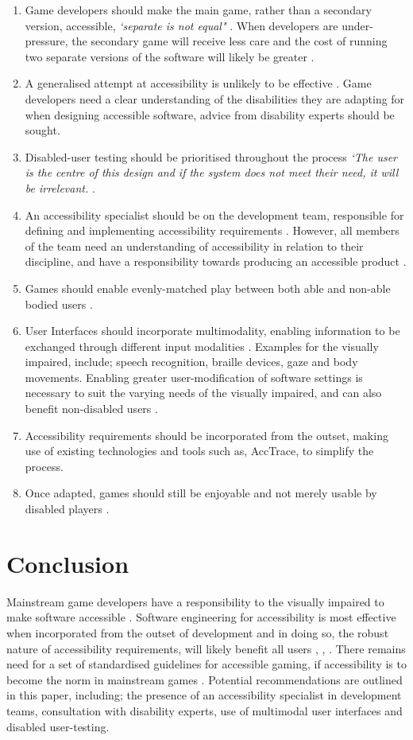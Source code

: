 \documentclass{scrartcl}
\begin{document}
\begin{enumerate}
\item Game developers should make the main game, rather than a secondary version, accessible, \textit{`separate is not equal"} \cite{17}. When developers are under-pressure, the secondary game will receive less care and the cost of running two separate versions of the software will likely be greater \cite{17}.
\item A generalised attempt at accessibility is unlikely to be effective \cite{17}. Game developers need a clear understanding of the disabilities they are adapting for when designing accessible software, advice from disability experts should be sought. 
\item Disabled-user testing should be prioritised throughout the process \textit{`The user is the centre of this design and if the system does not meet their need, it will be irrelevant.} \cite{15}.
\item An accessibility specialist should be on the development team, responsible for defining and implementing accessibility requirements \cite{12}. However, all members of the team need an understanding of accessibility in relation to their discipline, and have a responsibility towards producing an accessible product \cite{17}.
\item Games should enable evenly-matched play between both able and non-able bodied users \cite{11}.
\item User Interfaces should incorporate multimodality, enabling information to be exchanged through different input modalities \cite{16}. Examples for the visually impaired, include; speech recognition, braille devices, gaze and body movements. Enabling greater user-modification of software settings is necessary to suit the varying needs of the visually impaired, and can also benefit non-disabled users \cite{15}.
\item Accessibility requirements should be incorporated from the outset, making use of existing technologies and tools such as, AccTrace, to simplify the process. \cite{12}
\item Once adapted, games should still be enjoyable and not merely usable by disabled players \cite{19}.
\end{enumerate}

\section{Conclusion}

Mainstream game developers have a responsibility to the visually impaired to make software accessible \cite{17}. Software engineering for accessibility is most effective when incorporated from the outset of development and in doing so, the robust nature of accessibility requirements, will likely benefit all users \cite{5}, \cite{17}, \cite{20}. There remains need for a set of standardised guidelines for accessible gaming, if accessibility is to become the norm in mainstream games \cite{18}. Potential recommendations are outlined in this paper, including; the presence of an accessibility specialist in development teams, consultation with disability experts, use of multimodal user interfaces and disabled user-testing.




\end{document}
